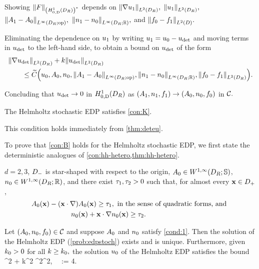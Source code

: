 \item Showing $\NHozDDRas{F}$ depends on $\NLtDR{\grad \uo},$ $\NLtDR{\uo},$ $\NLiDRRRdtd{\Ao-\Az},$ $\NLiDRRR{\no-\nz},$ and $\NLtD{\fz-\fo}.$
\item Eliminating the dependence on $u_{1}$ by writing $u_{1} = u_{0}-u_{\mathrm{det}}$ and moving terms in $u_{\mathrm{det}}$ to the left-hand side, to obtain a bound on $u_{\mathrm{det}}$ of the form
  \begin{align*}
&\NLtDR{\grad \ud} + k\NLtDR{\ud} \\
&\qquad\leq \Ctilde\Big(\uz,\Az,\nz,\NLiDRRRdtd{\Ao-\Az},\NLiDRRR{\no-\nz},\NLtDR{\fz-\fo}\Big).
\end{align*}
\item Concluding that $u_{\mathrm{det}}\rightarrow0$ in $\HozDDR$ as $(A_{1},n_{1},f_{1}) \rightarrow (A_{0},n_{0},f_{0})$ in $\mathcal C.$
\een\epf

\label{lem:hh-K}
The Helmholtz stochastic EDP satisfies \cref{con:K}.
\ele

This condition holds immediately from \cref{thm:deteu}.
\epf

To prove that \cref{con:B} holds for the Helmholtz stochastic EDP, we first state the deterministic analogues of \cref{con:hh-hetero,thm:hh-hetero}.

\label{cond:1}
$d=2,3$, $D_{-}$ is star-shaped with respect to the origin, $\Az\in \WoiDRRRdtd$, $\nz\in \WoiDRRR$, and there exist $\tau_{1}, \tau_{2}>0$ such that,
for almost every $\mathbf{x}\in D_{+}$,
\begin{align}\label{eq:A1}
&\Az(\bx) - (\bx\cdot\nabla)\Az(\bx) \geq \consto, \text{ in the sense of quadratic forms, and }\\
\label{eq:n1}
& \hspace{2cm}\nz(\bx)+ \bx\cdot\nabla \nz(\bx) \geq \constt. %
\end{align}
\econ

\label{thm:eubedp}
Let $(A_{0},n_{0},f_{0}) \in \mathcal C$ and suppose $A_{0}$ and $n_{0}$ satisfy \cref{cond:1}. Then the solution of the Helmholtz EDP (\cref{prob:edpstoch}) exists and is unique. Furthermore, given $k_{0} > 0$ for all $k \geq k_{0},$ the solution $u_{0}$ of the Helmholtz EDP satisfies the bound 
\beq\label{eq:heterobound1}
\consto \NLtDR{\grad \uz}^2 + \constt k^2 \NLtDR{\uz}^2\leq \Co \NLtDR{\fz}^2,\,\,  \,\, \Co := 4.
\eeq
\enth

